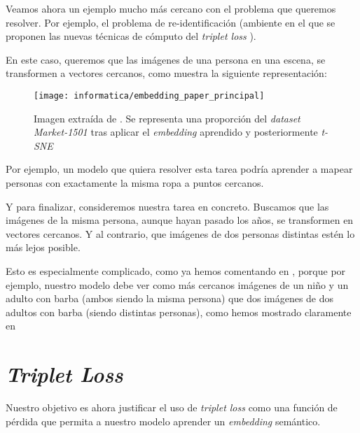 \begin{ejemplo}
    Veamos ahora un ejemplo mucho más cercano con el problema que queremos resolver. Por ejemplo, el problema de re-identificación (ambiente en el que se proponen las nuevas técnicas de cómputo del \textit{triplet loss} \cite{informatica:principal}).

    En este caso, queremos que las imágenes de una persona en una escena, se transformen a vectores cercanos, como muestra la siguiente representación:

    \begin{figure}[H]
        \centering
        \texttt{[image: informatica/embedding\_paper\_principal]}
        \caption{Imagen extraída de \cite{informatica:principal}. Se representa una proporción del \textit{dataset} \textit{Market-1501} tras aplicar el \textit{embedding} aprendido y posteriormente \textit{t-SNE}}
    \end{figure}

    Por ejemplo, un modelo que quiera resolver esta tarea podría aprender a mapear personas con exactamente la misma ropa a puntos cercanos.
\end{ejemplo}

\begin{ejemplo}

    Y para finalizar, consideremos nuestra tarea en concreto. Buscamos que las imágenes de la misma persona, aunque hayan pasado los años, se transformen en vectores cercanos. Y al contrario, que imágenes de dos personas distintas estén lo más lejos posible.

    Esto es especialmente complicado, como ya hemos comentando en , porque por ejemplo, nuestro modelo debe ver como más cercanos imágenes de un niño y un adulto con barba (ambos siendo la misma persona) que dos imágenes de dos adultos con barba (siendo distintas personas), como hemos mostrado claramente en 

\end{ejemplo}

\section{\textit{Triplet Loss}} \label{isec:triplet_loss}

Nuestro objetivo es ahora justificar el uso de \textit{triplet loss} como una función de pérdida que permita a nuestro modelo aprender un \textit{embedding} semántico.

